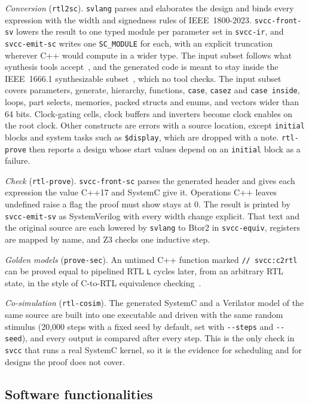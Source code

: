 \documentclass[preprint,12pt]{elsarticle}
\newcommand{\code}[1]{\texttt{#1}}
\begin{document}
\emph{Conversion} (\code{rtl2sc}). \code{svlang} parses and elaborates the design and binds every
expression with the width and signedness rules of IEEE~1800-2023. \code{svcc-front-sv} lowers the
result to one typed module per parameter set in \code{svcc-ir}, and \code{svcc-emit-sc} writes one
\code{SC\_MODULE} for each, with an explicit truncation wherever C++ would compute in a wider type.
The input subset follows what synthesis tools accept~\cite{sutherland2014synth}, and the generated
code is meant to stay inside the IEEE~1666.1 synthesizable subset~\cite{ieee1666_1_2016}, which no
tool checks. The input subset covers parameters, generate, hierarchy,
functions, \code{case}, \code{casez} and \code{case inside}, loops, part selects, memories, packed
structs and enums, and vectors wider than 64 bits. Clock-gating cells, clock buffers and inverters
become clock enables on the root clock. Other constructs are errors with a source location, except
\code{initial} blocks and system tasks such as \code{\$display}, which are dropped with a note.
\code{rtl-prove} then reports a design whose start values depend on an \code{initial} block as a
failure.

\emph{Check} (\code{rtl-prove}). \code{svcc-front-sc} parses the generated header and gives each
expression the value C++17 and SystemC give it. Operations C++ leaves undefined raise a flag the
proof must show stays at 0. The result is printed by \code{svcc-emit-sv} as SystemVerilog with
every width change explicit. That text and the original source are each lowered by \code{svlang}
to Btor2 in \code{svcc-equiv}, registers are mapped by name, and Z3 checks one inductive step.

\emph{Golden models} (\code{prove-sec}). An untimed C++ function marked \code{// svcc:c2rtl} can be
proved equal to pipelined RTL \code{L} cycles later, from an arbitrary RTL state, in the style of
C-to-RTL equivalence checking~\cite{koelbl2009c2rtl}.

\emph{Co-simulation} (\code{rtl-cosim}). The generated SystemC and a Verilator model of the same
source are built into one executable and driven with the same random stimulus (20,000 steps with a
fixed seed by default, set with \code{-{}-steps} and \code{-{}-seed}), and every output is compared after
every step. This is the only check in \code{svcc} that runs a real SystemC kernel,
so it is the evidence for scheduling and for designs the proof does not cover.

\subsection{Software functionalities}
\end{document}
